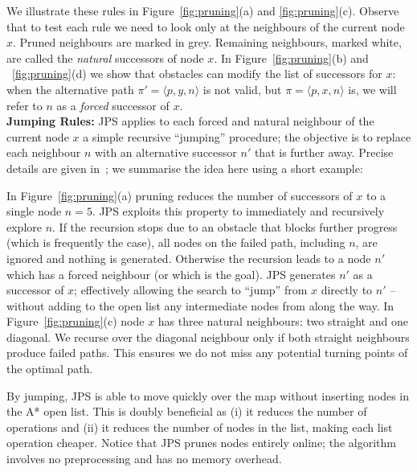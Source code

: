 We illustrate these rules in Figure~\ref{fig:pruning}(a) and \ref{fig:pruning}(c).
Observe that to test each rule we need to look only at
the neighbours of the current node $x$. 
Pruned neighbours are marked in grey. Remaining neighbours, marked
white, are called the \emph{natural} successors of node $x$.  
In Figure~\ref{fig:pruning}(b) and ~\ref{fig:pruning}(d) we show
that obstacles can modify the list of successors for $x$:
when the alternative path $\pi' = \langle p, y, n \rangle$ is
not valid, but $\pi = \langle p, x, n \rangle$ is, we will refer to $n$ as
a \emph{forced} successor of $x$.
\\ \newline
\textbf{Jumping Rules:}
JPS applies to each forced and natural neighbour of the current node $x$ a simple recursive
``jumping'' procedure; the objective is to replace each neighbour $n$ with an 
alternative successor $n'$ that is further away. Precise details are given
in~\cite{harabor11b}; we summarise the idea here using a short example:

\begin{example}
In Figure~\ref{fig:pruning}(a) pruning reduces the number
of successors of $x$ to a single node $n = 5$.
JPS exploits this property to immediately and recursively
explore $n$.
If the recursion stops due to an obstacle that blocks further progress
(which is frequently the case), all nodes on the failed path, including $n$, are ignored
and nothing is generated.
Otherwise the recursion leads to a node $n'$ which has a forced
neighbour (or which is the goal). JPS generates $n'$ as a successor of $x$; 
effectively allowing the search to ``jump'' from $x$ directly to $n'$ -- without adding
to the open list any intermediate nodes from along the way.
In Figure~\ref{fig:pruning}(c) node $x$ has three natural neighbours: two straight and one diagonal.
We recurse over the diagonal neighbour only if both straight neighbours produce
failed paths. This ensures we do not miss any potential turning points of the optimal path.
\end{example}

%
By jumping, JPS is able to move quickly over the map 
without inserting nodes in the A* open list.
This is doubly beneficial as (i) it reduces the number of operations 
and (ii) it reduces the number of nodes in the list, 
making each list operation cheaper.  
Notice that JPS prunes nodes entirely online; the algorithm involves no preprocessing and has no memory overhead.  

